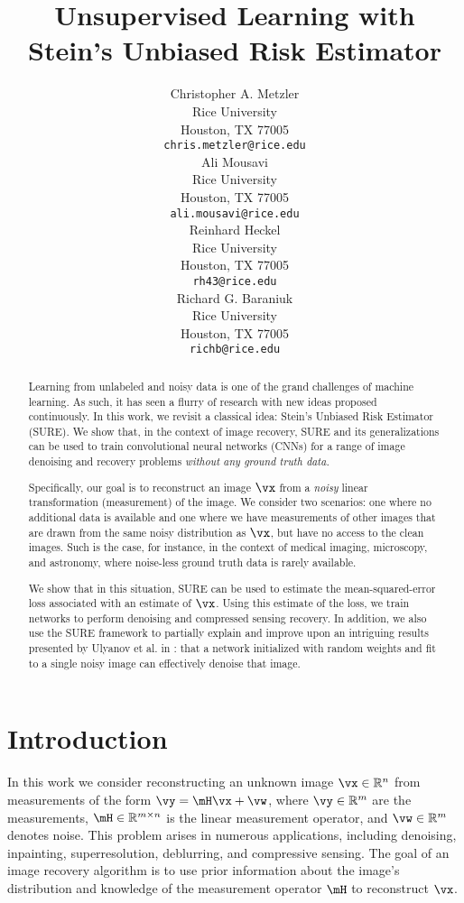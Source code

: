 \documentclass{article}
\title{Unsupervised Learning with \\ Stein's Unbiased Risk Estimator}
\author{
  Christopher A. Metzler\\
  Rice University\\
  Houston, TX 77005 \\
  \texttt{chris.metzler@rice.edu} \\
  \And
  Ali Mousavi\\
  Rice University\\
  Houston, TX 77005 \\
  \texttt{ali.mousavi@rice.edu} \\
  \And
  Reinhard Heckel\\
  Rice University\\
  Houston, TX 77005 \\
  \texttt{rh43@rice.edu} \\
  \And
  Richard G. Baraniuk\\
  Rice University\\
  Houston, TX 77005 \\
  \texttt{richb@rice.edu} \\
}
\newcommand\img{\vx}
\newcommand\obs{\vy}
\newcommand\noise{\vw}
\begin{document}
\maketitle

\begin{abstract}
Learning from unlabeled and noisy data is one of the grand challenges of machine learning. 
As such, it has seen a flurry of research with new ideas proposed continuously. 
In this work, we revisit a classical idea: Stein's Unbiased Risk Estimator (SURE). 
We show that, in the context of image recovery, SURE and its generalizations can be used to train convolutional neural networks (CNNs) for a range of image denoising and recovery problems {\em without any ground truth data.}

Specifically, our goal is to  reconstruct an image $\img$ from a \emph{noisy} linear transformation (measurement) of the image.
We consider two scenarios: one where no additional data is available and one where we have measurements of other images that are drawn from the same noisy distribution as $\img$, but have no access to the clean images. 
Such is the case, for instance, in the context of medical imaging, microscopy, and astronomy, where noise-less ground truth data is rarely available.

We show that in this situation, SURE can be used to estimate the mean-squared-error loss associated with an estimate of $\img$. 
Using this estimate of the loss, we train networks to perform denoising and compressed sensing recovery. 
In addition, we also use the SURE framework to partially explain and improve upon an intriguing results presented by Ulyanov et al. in \cite{DeepImagePrior}: that a network initialized with random weights and fit to a single noisy image can effectively denoise that image.

\end{abstract}

\section{Introduction}%
In this work we consider reconstructing an unknown image $\img \in\mathbb{R}^n$ from measurements of the form $\obs = \mH \img + \noise$, where $\obs\in\mathbb{R}^m$ are the measurements, $\mH\in\mathbb{R}^{m\times n}$ is the linear measurement operator, and $\noise \in\mathbb{R}^m$ denotes noise.
This problem arises in numerous applications, including denoising, inpainting, superresolution, deblurring, and compressive sensing.
The goal of an image recovery algorithm is to use prior information about the image's distribution and knowledge of the measurement operator $\mH$ to reconstruct $\img$.
\end{document}
